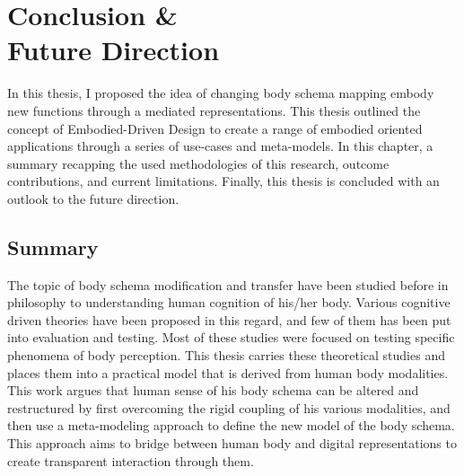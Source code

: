 
\chapter[Conclusion \& Future Direction]{Conclusion \&\\ Future Direction}
\label{ch:conc}


In this thesis, I proposed the idea of changing body schema mapping embody new functions through a mediated representations. This thesis outlined the concept of Embodied-Driven Design to create a range of embodied oriented applications through a series of use-cases and meta-models. In this chapter, a summary recapping the used methodologies of this research, outcome contributions, and current limitations. Finally, this thesis is concluded with an outlook to the future direction. %

\section{Summary}

The topic of body schema modification and transfer have been studied before in philosophy to understanding human cognition of his/her body. Various cognitive driven theories have been proposed in this regard, and few of them has been put into evaluation and testing. Most of these studies were focused on testing specific phenomena of body perception. This thesis carries these theoretical studies and places them into a practical model that is derived from human body modalities. This work argues that human sense of his body schema can be altered and restructured by first overcoming the rigid coupling of his various modalities, and then use a meta-modeling approach to define the new model of the body schema. This approach aims to bridge between human body and digital representations to create transparent interaction through them.

